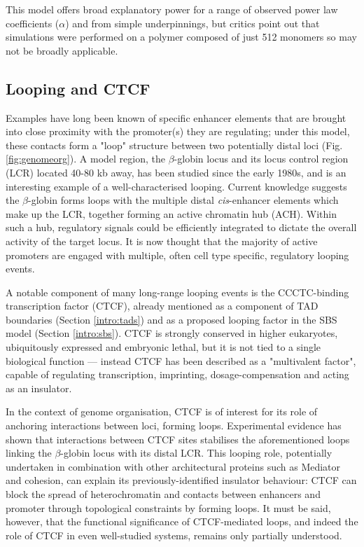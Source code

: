 \documentclass[a4paper,11pt,oneside]{book}
\begin{document}
This model offers broad explanatory power for a range of observed power law coefficients ($\alpha$) and from simple underpinnings, but critics point out that simulations were performed on a polymer composed of just 512 monomers so may not be broadly applicable.\cite{Dekker2013}

\subsection{Looping and CTCF}\label{intro:loops}

Examples have long been known of specific enhancer elements that are brought into close proximity with the promoter(s) they are regulating; under this model, these contacts form a "loop" structure between two potentially distal loci\cite{Kadauke2009a, Sexton2009} (Fig. \ref{fig:genomeorg}). A model region, the $\beta$-globin locus and its locus control region (LCR) located 40-80 kb away,\cite{Dekker2013} has been studied since the early 1980s,\cite{Banerji1981, Engel2000, Blackwood1998, Tolhuis2002} and is an interesting example of a well-characterised looping. Current knowledge suggests the $\beta$-globin forms loops with the multiple distal \emph{cis}-enhancer elements which make up the LCR, together forming an active chromatin hub (ACH).\cite{VandeCorput2012a} Within such a hub, regulatory signals could be efficiently integrated to dictate the overall activity of the target locus.\cite{DeWit2012, Pombo2015} It is now thought that the majority of active promoters are engaged with multiple, often cell type specific, regulatory looping events.\cite{Sanyal2012, Jin2013}

A notable component of many long-range looping events is the CCCTC-binding transcription factor (CTCF),\cite{Ong2014, Phillips2009} already mentioned as a component of TAD boundaries (Section \ref{intro:tads}) and as a proposed looping factor in the SBS model (Section \ref{intro:sbs}). CTCF is strongly conserved in higher eukaryotes,\cite{Filippova1996a} ubiquitously expressed and embryonic lethal, but it is not tied to a single biological function --- instead CTCF has been described as a "multivalent factor",\cite{Phillips2009} capable of regulating transcription, imprinting, dosage-compensation and acting as an insulator. 

In the context of genome organisation, CTCF is of interest for its role of anchoring interactions between loci, forming loops. Experimental evidence has shown that interactions between CTCF sites stabilises the aforementioned loops linking the $\beta$-globin locus with its distal LCR.\cite{Splinter2006} This looping role, potentially undertaken in combination with other architectural proteins such as Mediator and cohesion,\cite{Phillips-Cremins2013, Sexton2009} can explain its previously-identified insulator behaviour: CTCF can block the spread of heterochromatin and contacts between enhancers and promoter through topological constraints by forming loops.\cite{Phillips2009} It must be said, however, that the functional significance of CTCF-mediated loops, and indeed the role of CTCF in even well-studied systems, remains only partially understood.\cite{Gomez-Diaz2014}
\end{document}
